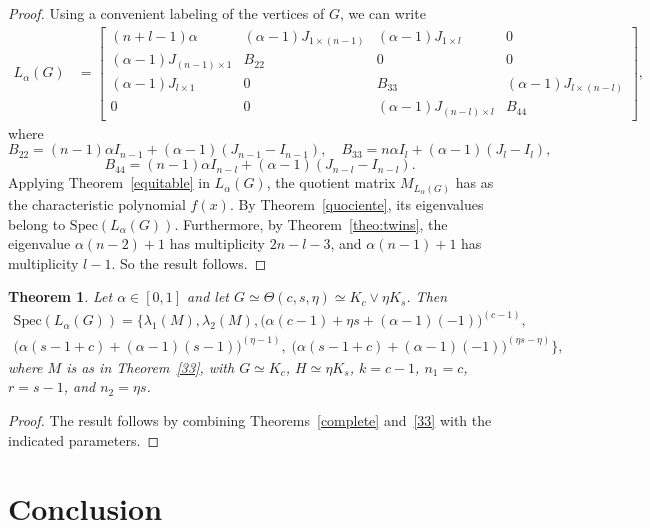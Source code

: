 \documentclass{article}
\newtheorem{theorem}{Theorem}[section]
\begin{document}
\begin{proof}
Using a convenient labeling of the vertices of $G$, we can write
\begin{align*}
L_\alpha(G) &= \begin{bmatrix} 
(n+l-1)\alpha & (\alpha-1)J_{1\times(n-1)} & (\alpha-1)J_{1\times l} & 0\\ 
(\alpha-1)J_{(n-1)\times 1} & B_{22} & 0 & 0 \\
(\alpha-1)J_{l\times 1} & 0 & B_{33} & (\alpha-1)J_{l\times(n-l)} \\
0 & 0 & (\alpha-1)J_{(n-l)\times l} & B_{44}
\end{bmatrix},
\end{align*}
where
\[
B_{22}=(n-1)\alpha I_{n-1}+(\alpha-1)(J_{n-1}-I_{n-1}),\quad
B_{33}=n\alpha I_l+(\alpha-1)(J_l-I_l),\]
\[
B_{44}=(n-1)\alpha I_{n-l}+(\alpha-1)(J_{n-l}-I_{n-l}).
\]
Applying Theorem~\ref{equitable} in $L_\alpha(G)$, the quotient matrix $M_{L_\alpha(G)}$ has as the characteristic polynomial $f(x)$. By Theorem~\ref{quociente}, its eigenvalues belong to $\mathrm{Spec}(L_\alpha(G))$. Furthermore, by Theorem~\ref{theo:twins}, the eigenvalue $\alpha(n-2)+1$ has multiplicity $2n-l-3$, and $\alpha(n-1)+1$ has multiplicity $l-1$. So the result follows.
\end{proof}

\begin{theorem}
Let $\alpha \in [0,1]$ and let $G \simeq \Theta(c, s, \eta) \simeq K_c \lor \eta K_s$. Then
\begin{multline*}
\mathrm{Spec}(L_\alpha(G)) = 
\Big\{\lambda_1(M), \lambda_2(M), 
\big(\alpha (c-1)+\eta s + (\alpha-1)(-1)\big)^{(c-1)}, \\
\big(\alpha (s-1+ c) + (\alpha-1)(s-1)\big)^{(\eta-1)}, \;
\big(\alpha (s-1+ c) + (\alpha-1)(-1)\big)^{(\eta s- \eta)}  \Big\},
\end{multline*}
where $M$ is as in Theorem~\ref{33}, with $G\simeq K_c$, $H\simeq \eta K_s$, $k=c-1$, $n_1=c$, $r=s-1$, and $n_2=\eta s$.
\end{theorem}

\begin{proof}
The result follows by combining Theorems~\ref{complete} and~\ref{33} with the indicated parameters.
\end{proof}

\section{Conclusion}\label{sec4}
\end{document}
